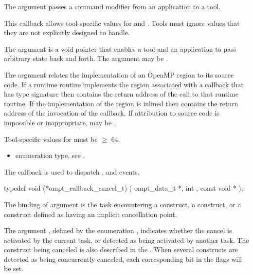 The argument  passes a command modifier from an
application to a tool.

This callback allows tool-specific values for  and
.  Tools must ignore  values that they are
not explicitly designed to handle.

The argument  is a void pointer that enables a tool and
an application to pass arbitrary state back and forth.
The argument  may be .

The  argument relates the implementation of an OpenMP region
to its source code. If a runtime routine implements the region associated with
a callback that has type signature  then
 contains the return address of the call to that runtime routine.
If the implementation of the region is inlined then  contains the
return address of the invocation of the callback. If attribution to source code
is impossible or inappropriate, may be .

\constraints
Tool-specific values for  must be $\geq$ 64.

\crossreferences
\begin{itemize}
\item {} enumeration type, see .
\end{itemize}

\label{sec:ompt_callback_cancel_t}
\summary
The  callback is used to dispatch
,  and  events.

\format

\begin{ccppspecific}
\begin{omptCallback}
typedef void (*ompt_callback_cancel_t) (
  ompt_data_t *,
  int ,
  const void *
);
\end{omptCallback}
\end{ccppspecific}


\argdesc

The binding of argument  is the task
encountering a  construct, a 
construct, or a construct defined as having an implicit cancellation
point.

The argument , defined by the enumeration
, indicates whether the cancel is
activated by the current task, or detected as being activated by
another task.  The construct being canceled is also described in the
. When several constructs are detected as being
concurrently canceled, each corresponding bit in the flags will be
set.

